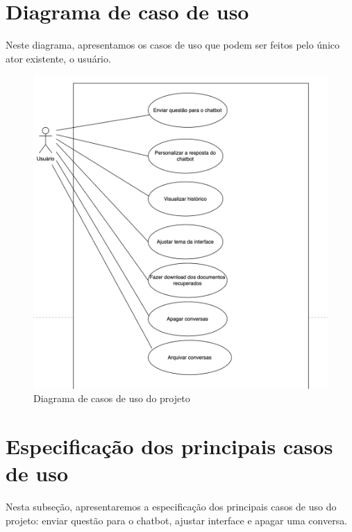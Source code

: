 \documentclass[
	12pt,				%
	openright,			%
	oneside,			    %
	a4paper,				%
	english,			%
	french,			%
	spanish,			%
	brazil			%
	]{abntex2}
\begin{document}
\section{Diagrama de caso de uso}
Neste diagrama, apresentamos os casos de uso que podem ser feitos pelo único ator existente, o usuário.

\begin{figure}[h!]
    \centering
    \includegraphics[width=0.8\linewidth]{Diagrama de casos de uso.png}
    \caption{Diagrama de casos de uso do projeto}
    \label{fig:enter-label}
\end{figure}

\section{Especificação dos principais casos de uso}
Nesta subseção, apresentaremos a especificação dos principais casos de uso do projeto: enviar questão para o chatbot, ajustar interface e apagar uma conversa.
\end{document}
